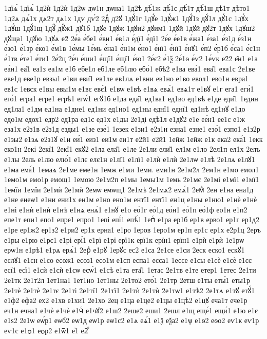 {1дїѧ́
1дїѧ́
1д2ѝ
1д2ѝ
1д2ѡ
дѡ1н
дѡна1
1д2ѣ
дѣ́1ж
дѣ́1с
дѣ́1т
дѣ́1ш
дѣ1т
дѣто1
1д2ѧ
дѧ́1х
дѧ2т
дѧ1х
1дѵ
дѵ́2
2дⷧ
д2ꙋ
1дꙋ́1г
1дꙋ́е
1дꙋ́ж1
1дꙋ́1з
дꙋ́1л
дꙋ́1с
1дꙋ́х
1дꙋ́ш
1дꙋ́1щ
1дꙋ̑
дꙋ̑ж1
дꙋ1б
1дꙋе
1дꙋж
1дꙋи2
дꙋим1
1дꙋй
1дꙋй
дꙋ2т
1дꙋх
1дꙋш2
дꙋща1
1дꙋю
1дꙋѧ
е2́
2е́а
е́бе1
е́ви1
е́в1л
е́дї1
е́дї1
2е́е
е́е1в
е́жа1
е́за1
е́з1д
е́з1н
е́зо1
е́1зр
е́ко1
е́м1в
1е́мы
1е́мь
е́на1
е́н1м
е́но1
е́нї1
е́нї1
е́нꙋ1
е́п2
е́р1б
е́са1
е́с1н
е́1тв
е́те1
е́ти1
2е́2ц
2е́ч
е́ши1
е́щї1
е́щї1
е́ю1
2е́є2
е́1ѯ
2е́1ѳ
е́ѵ2
1е́ѵк
е2̑2
е̑н1
е1а
еа́н1
еа̑1
еа1з
еа1м
е1б
ебе1л
еб1ле
еб1лю
ебо́1
ебѣ2
е1ва
ева́1
ева̑1
ева1с
2е1ве
еве1д
еве1р
евзы1
е1ви
еви̑1
ев1ле
ев1лѧ
е1вни
ев1но
е1во
евол1
ево1н
евра1
ев1с
1евск
е1вы
евы1м
е1вє
евє́1
е1вѡ
е1вѣ
е1вѧ
евѧ́1
евѧ1т
е1вꙋ
е1г
ега1
еги́1
его́1
егра1
егре1
егрѣ1
егѡ́1
егꙋ1б
е1да
еда̑1
ед1ва1
ед1во
ед1вѣ
е1де
еди̑1
1един
ед1ла1
е1дм
ед1на
е1дне1
ед1ни
ед1но1
ед1ны
еднї1
еднї1
ед1нѣ
ед1нꙋ
е1до
едо1м
едох1
едр2
ед1ра
ед1с
ед1х
е1ды
2е1ді
едѣ1л
е1дꙋ2
е1е
ее́н1
ее1с
е1ж
еза1х
е2з1в
е2з1д
езды1
е1зе
езе́1
1езек
е1зи1
е2з1н
езна1
езне1
езо́1
езпо1
е1з2р
е1зы2
е1зѧ
е2з1ꙋ
е1и
еи́1
еиз1
еи1м
еи1т
е2й1
е2й1
1ейж
1ейж
е1к
ека2
ека́1
1екк
еко1н
2екі
2екї1
2екї1
екꙋ2
е1ла
ела̑1
е1ле
2е1ли
ели̑1
ел1м
е1ло
2ел1п
ел1х
2елъ
е1лы
2ель
е1лю
елю́1
е1лє
елє1н
е1лї1
е1лї1
е1лѝ
е1лѝ
2е1лѡ
е1лѣ
2е1лѧ
е1лꙋ1
е1ма
ема́1
1емаѧ
2е1ме
еме1н
1емж
е1ми
1еми.
еми1н
2е1м2л
2ем1н
е1мо
емол1
1емо1м
емо1р
емощ1
1емою
2е1м2п
е1мы
1емы1м
1емь
2е1мє
2е1мі
е1мї1
е1мї1
1емїи
1емїи
2е1мѝ
2е1мѝ
2емѡ
емѡщ1
2е1мѣ
2е1мѧ2
емѧ́1
2емⷣ
2ен
е1на
ена1д
е1не
енеѡ1
е1ни
ени1х
ен1м
е1но
ено1м
ентї1
ентї1
ен1ц
е1ны
е1ню1
е1нѐ
е1нѐ
е1ні
е1нѝ
е1нѝ
е1нѣ
е1нѧ
енѧ́1
е1нꙋ
е1о
ео́1г
ео́1д
ео́н1
ео́1п
ео́1ф
ео1н
е1п2
епе1т
епи1
епо1
епре1
епро1
1епі
епі́1
епѣ́1
1епⷭ
е1ра
ер1б
ер1в
ерво1
ер1г
ер1д2
е1ре
ер1ж2
ер1з2
е1ри2
ер1к
ерна1
е1ро
1еров
1еро1м
ер1п
ер1с
ер1х
е2р1ц
2еръ
е1ры
е1рю
е1рє1
е1рі
ері́1
е1рї
е1рї
ерї1к
ерї1к
ерїн1
ерїн1
е1рѝ
е1рѝ
1е1рѡ
ерѡ1н
е1рѣ1
е1рѧ
ерѧ́1
2ерⷭ
е1рꙋ
1ерꙋс
ес2
е1са
2е1се
е1си
2еск
еско1
ескꙋ1
еслꙋ1
е1сн
е1со
есож1
есоз1
есо1м
е1сп
еспа1
есса1
1ессе
е1сы
е1сѐ
е1сѐ
е1сє
есї1
есї1
е1сѝ
е1сѝ
е1сѡ
есѡ́1
е1сѣ
е1та
ета̑1
1етас
2е1тв
е1те
етер1
1етес
2е1ти
2е1тк
2е1т2л
1ет1на1
1ет1но
1ет1ны
2е1то2
ето́1
2е1тр
2етш
е1ты
еты́1
еты1р
2е1тѐ
2е1тѐ
2е1тє
2е1ті
2е1тї1
2е1тї1
2е1тѝ
2е1тѝ
2е1тѡ1
е1тѣ2
2е1тѧ
е1тꙋ
етꙋ́1
е1ф2
ефа2
ех2
е1хв
е1хи1
2е1хо
2ец
е1ца
е1це2
е1цы
е1цѣ2
е1цꙋ
еча1т
ече1р
еч1н
ечна1
е1чѐ
е1чѐ
е1чⷭ
е1чꙋ2
е1ш2
2еше2
еши1
2ешл
е1щ
еще́1
ещи́1
е1ю
е1є
е1ѕ2
2е1ѡ
еѡ́р1
еѡб2
еѡ1д
еѡ1р
еѡ1с2
е1ѧ
еѧ́1
е1ѯ
еѯа2
е1ѱ
е1ѳ2
еѳо2
еѵ1к
еѵ1р
еѵ1с
е1ѻ1
еѻр2
е1ѿ1
е҆1
е2ⷡ
}
